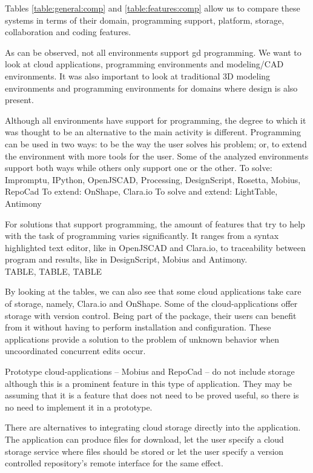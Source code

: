 Tables \ref{table:general:comp} and \ref{table:features:comp} allow us to compare these systems in terms of their domain, programming support, platform, storage, collaboration and coding features.

As can be observed, not all environments support \gls{gd} programming.
We want to look at cloud applications, programming environments and modeling/CAD environments.
It was also important to look at traditional 3D modeling environments and programming environments for domains where design is also present.


Although all environments have support for programming, the degree to which it was thought to be an alternative to the main activity is different.
Programming can be used in two ways: to be the way the user solves his problem; or, to extend the environment with more tools for the user.
Some of the analyzed environments support both ways while others only support one or the other.
To solve: Impromptu, IPython, OpenJSCAD, Processing, DesignScript, Rosetta, Mobius, RepoCad
To extend: OnShape, Clara.io
To solve and extend: LightTable, Antimony

For solutions that support programming, the amount of features that try to help with the task of programming varies significantly.
It ranges from a syntax highlighted text editor, like in OpenJSCAD and Clara.io, to traceability between program and results, like in DesignScript, Mobius and Antimony.
\\TABLE, TABLE, TABLE


By looking at the tables, we can also see that some cloud applications take care of storage, namely, Clara.io and OnShape.
Some of the cloud-applications offer storage with version control.
Being part of the package, their users can benefit from it without having to perform installation and configuration.
These applications provide a solution to the problem of unknown behavior when uncoordinated concurrent edits occur.

Prototype cloud-applications -- Mobius and RepoCad -- do not include storage although this is a prominent feature in this type of application.
They may be assuming that it is a feature that does not need to be proved useful, so there is no need to implement it in a prototype.

There are alternatives to integrating cloud storage directly into the application.
The application can produce files for download, let the user specify a cloud storage service where files should be stored or let the user specify a version controlled repository's remote interface for the same effect.


